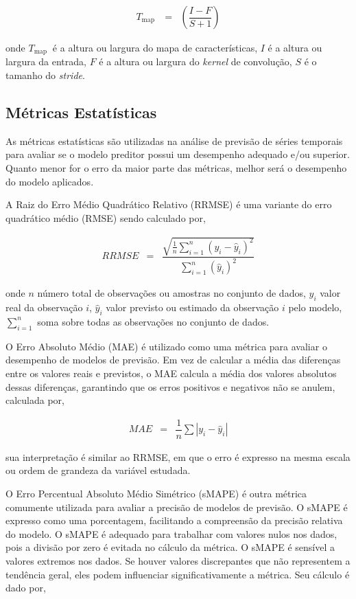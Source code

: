  \begin{eqnarray}
 	T_{\text {map }}&=&\left(\dfrac{I-F}{S+1}\right)\label{cnn1}
 \end{eqnarray}
 
 \noindent onde
 $T_{\text {map }}$ é a altura ou largura do mapa de características,
 $I$ é a altura ou largura da entrada,
 $F$ é a altura ou largura do \textit{kernel} de convolução,
 $S$ é o tamanho do \textit{stride}.
 
 \subsection{M\'etricas Estat\'isticas}\label{subsec:metrica}
 
As métricas estatísticas são utilizadas na análise de previsão de séries temporais para avaliar se o modelo preditor possui um desempenho adequado e/ou superior. Quanto menor for o erro da maior parte das métricas, melhor será o desempenho do modelo aplicados.
 
A Raiz do Erro Médio Quadrático Relativo (RRMSE) é uma variante do erro quadrático médio (RMSE) sendo calculado por,
 
 \begin{eqnarray}
 	R R M S E&=&\dfrac{\sqrt{\frac{1}{n} \sum_{i=1}^n\left(y_i-\hat{y}_i\right)^2}}{\sum_{i=1}^n\left(\hat{y}_i\right)^2}
 \end{eqnarray}
 
 \noindent onde \(n\) número total de observações ou amostras no conjunto de dados,
 \(y_i\) valor real da observação \(i\),
 \(\hat{y}_i\) valor previsto ou estimado da observação \(i\) pelo modelo,
 \(\sum_{i=1}^{n}\) soma sobre todas as observações no conjunto de dados.
 
O Erro Absoluto Médio (MAE) é utilizado como uma métrica para avaliar o desempenho de modelos de previsão. Em vez de calcular a média das diferenças entre os valores reais e previstos, o MAE calcula a média dos valores absolutos dessas diferenças, garantindo que os erros positivos e negativos não se anulem, calculada por,
 
 \begin{eqnarray}
 	M A E &=& \dfrac{1}{n} \sum\left|y_i-\hat{y}_i\right|\label{eq:mae}
 \end{eqnarray}
 
 \noindent sua interpretação é similar ao RRMSE, em que o erro é expresso na mesma escala ou ordem de grandeza da variável estudada.
 
O Erro Percentual Absoluto Médio Simétrico (sMAPE) é outra métrica comumente utilizada para avaliar a precisão de modelos de previsão. O sMAPE é expresso como uma porcentagem, facilitando a compreensão da precisão relativa do modelo. O sMAPE é adequado para trabalhar com valores nulos nos dados, pois a divisão por zero é evitada no cálculo da métrica. O sMAPE é sensível a valores extremos nos dados. Se houver valores discrepantes que não representem a tendência geral, eles podem influenciar significativamente a métrica. Seu cálculo é dado por,
  
